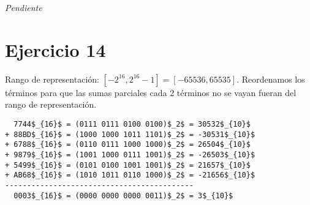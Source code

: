 \emph{Pendiente}

\section{Ejercicio 14}

Rango de representación: $[-2^{16}, 2^{16} - 1] = [-65536, 65535]$. Reordenamos los términos para que las sumas parciales cada 2 términos no se vayan fueran del rango de representación.

\begin{lstlisting}
  7744$_{16}$ = (0111 0111 0100 0100)$_2$ = 30532$_{10}$
+ 88BD$_{16}$ = (1000 1000 1011 1101)$_2$ = -30531$_{10}$
+ 6788$_{16}$ = (0110 0111 1000 1000)$_2$ = 26504$_{10}$
+ 9879$_{16}$ = (1001 1000 0111 1001)$_2$ = -26503$_{10}$
+ 5499$_{16}$ = (0101 0100 1001 1001)$_2$ = 21657$_{10}$
+ AB68$_{16}$ = (1010 1011 0110 1000)$_2$ = -21656$_{10}$
-------------------------------------------
  0003$_{16}$ = (0000 0000 0000 0011)$_2$ = 3$_{10}$
\end{lstlisting}


